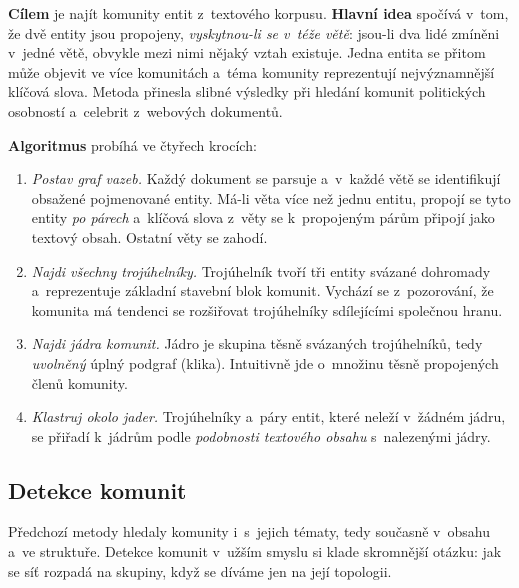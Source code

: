 \documentclass[11pt,a4paper]{article}
\theoremstyle{definition}
\begin{document}
\begin{defbox}
\textbf{Cílem} je najít komunity entit z~textového korpusu. \textbf{Hlavní idea} spočívá
v~tom, že dvě entity jsou propojeny, \emph{vyskytnou-li se v~téže větě}: jsou-li dva lidé
zmíněni v~jedné větě, obvykle mezi nimi nějaký vztah existuje. Jedna entita se přitom může
objevit ve více komunitách a~téma komunity reprezentují nejvýznamnější klíčová slova. Metoda
přinesla slibné výsledky při hledání komunit politických osobností a~celebrit z~webových
dokumentů.

\textbf{Algoritmus} probíhá ve čtyřech krocích:
\begin{enumerate}
\item \emph{Postav graf vazeb.} Každý dokument se parsuje a~v~každé větě se identifikují
      obsažené pojmenované entity. Má-li věta více než jednu entitu, propojí se tyto entity
      \emph{po párech} a~klíčová slova z~věty se k~propojeným párům připojí jako textový obsah.
      Ostatní věty se zahodí.
\item \emph{Najdi všechny trojúhelníky.} Trojúhelník tvoří tři entity svázané dohromady
      a~reprezentuje základní stavební blok komunit. Vychází se z~pozorování, že komunita má
      tendenci se rozšiřovat trojúhelníky sdílejícími společnou hranu.
\item \emph{Najdi jádra komunit.} Jádro je skupina těsně svázaných trojúhelníků, tedy
      \emph{uvolněný} úplný podgraf (klika). Intuitivně jde o~množinu těsně propojených členů
      komunity.
\item \emph{Klastruj okolo jader.} Trojúhelníky a~páry entit, které neleží v~žádném jádru, se
      přiřadí k~jádrům podle \emph{podobnosti textového obsahu} s~nalezenými jádry.
\end{enumerate}
\end{defbox}

\subsection{Detekce komunit}

Předchozí metody hledaly komunity i~s~jejich tématy, tedy současně v~obsahu a~ve struktuře.
Detekce komunit v~užším smyslu si klade skromnější otázku: jak se síť rozpadá na skupiny, když
se díváme jen na její topologii.
\end{document}
